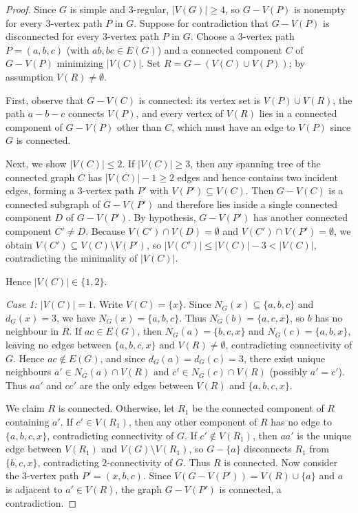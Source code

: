 \documentclass[11pt,a4paper]{article}
\begin{document}
\begin{proof}
Since $G$ is simple and $3$-regular, $|V(G)| \ge 4$, so $G - V(P)$ is nonempty for every $3$-vertex path $P$ in $G$. Suppose for contradiction that $G - V(P)$ is disconnected for every $3$-vertex path $P$ in $G$. Choose a $3$-vertex path $P = (a, b, c)$ (with $ab, bc \in E(G)$) and a connected component $C$ of $G - V(P)$ minimizing $|V(C)|$. Set $R = G - (V(C) \cup V(P))$; by assumption $V(R) \neq \emptyset$.

First, observe that $G - V(C)$ is connected: its vertex set is $V(P) \cup V(R)$, the path $a - b - c$ connects $V(P)$, and every vertex of $V(R)$ lies in a connected component of $G - V(P)$ other than $C$, which must have an edge to $V(P)$ since $G$ is connected.

Next, we show $|V(C)| \le 2$. If $|V(C)| \ge 3$, then any spanning tree of the connected graph $C$ has $|V(C)| - 1 \ge 2$ edges and hence contains two incident edges, forming a $3$-vertex path $P'$ with $V(P') \subseteq V(C)$. Then $G - V(C)$ is a connected subgraph of $G - V(P')$ and therefore lies inside a single connected component $D$ of $G - V(P')$. By hypothesis, $G - V(P')$ has another connected component $C' \neq D$. Because $V(C') \cap V(D) = \emptyset$ and $V(C') \cap V(P') = \emptyset$, we obtain $V(C') \subseteq V(C) \setminus V(P')$, so $|V(C')| \le |V(C)| - 3 < |V(C)|$, contradicting the minimality of $|V(C)|$.

Hence $|V(C)| \in \{1, 2\}$.

\medskip\noindent\textit{Case 1: $|V(C)| = 1$.} Write $V(C) = \{x\}$. Since $N_G(x) \subseteq \{a, b, c\}$ and $d_G(x) = 3$, we have $N_G(x) = \{a, b, c\}$. Thus $N_G(b) = \{a, c, x\}$, so $b$ has no neighbour in $R$. If $ac \in E(G)$, then $N_G(a) = \{b, c, x\}$ and $N_G(c) = \{a, b, x\}$, leaving no edges between $\{a, b, c, x\}$ and $V(R) \neq \emptyset$, contradicting connectivity of $G$. Hence $ac \notin E(G)$, and since $d_G(a) = d_G(c) = 3$, there exist unique neighbours $a' \in N_G(a) \cap V(R)$ and $c' \in N_G(c) \cap V(R)$ (possibly $a' = c'$). Thus $a a'$ and $c c'$ are the only edges between $V(R)$ and $\{a, b, c, x\}$.

We claim $R$ is connected. Otherwise, let $R_1$ be the connected component of $R$ containing $a'$. If $c' \in V(R_1)$, then any other component of $R$ has no edge to $\{a, b, c, x\}$, contradicting connectivity of $G$. If $c' \notin V(R_1)$, then $a a'$ is the unique edge between $V(R_1)$ and $V(G) \setminus V(R_1)$, so $G - \{a\}$ disconnects $R_1$ from $\{b, c, x\}$, contradicting $2$-connectivity of $G$. Thus $R$ is connected. Now consider the $3$-vertex path $P' = (x, b, c)$. Since $V(G - V(P')) = V(R) \cup \{a\}$ and $a$ is adjacent to $a' \in V(R)$, the graph $G - V(P')$ is connected, a contradiction.


\end{proof}
\end{document}
